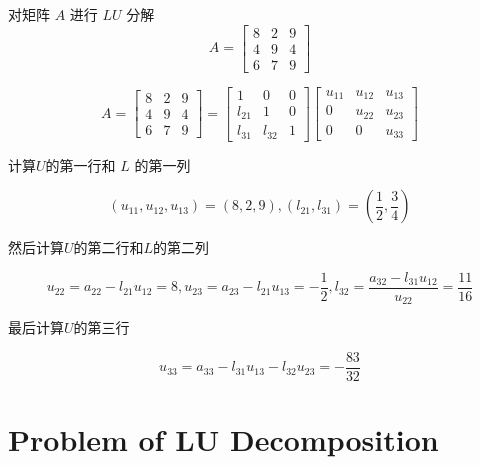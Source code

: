 \begin{example}
    对矩阵 $ A $ 进行 $ L U $ 分解
    \begin{equation}
        A=\left[\begin{array}{lll}
                8 & 2 & 9 \\
                4 & 9 & 4 \\
                6 & 7 & 9
            \end{array}\right]
    \end{equation}


    \begin{equation} A=\left[\begin{array}{lll}8 & 2 & 9 \\ 4 & 9 & 4 \\ 6 & 7 & 9\end{array}\right]=\left[\begin{array}{ccc}1 & 0 & 0 \\ l_{21} & 1 & 0 \\ l_{31} & l_{32} & 1\end{array}\right]\left[\begin{array}{ccc}u_{11} & u_{12} & u_{13} \\ 0 & u_{22} & u_{23} \\ 0 & 0 & u_{33}\end{array}\right] \end{equation}

    计算$U$的第一行和 $ L $ 的第一列

    \begin{equation} \left(u_{11}, u_{12}, u_{13}\right)=(8,2,9) , \left(l_{21}, l_{31}\right)=\left(\frac{1}{2}, \frac{3}{4}\right) \end{equation}

    然后计算$U$的第二行和$L$的第二列

    \begin{equation} u_{22}=a_{22}-l_{21} u_{12}=8 ,
        u_{23}=a_{23}-l_{21} u_{13}=-\frac{1}{2} , l_{32}=\frac{a_{32}-l_{31} u_{12}}{u_{22}}=\frac{11}{16} \end{equation}


    最后计算$U$的第三行

    \begin{equation} u_{33}=a_{33}-l_{31}  u_{13}-l_{32} u_{23}=-\frac{83}{32} \end{equation}

\end{example}

\section{Problem of LU Decomposition}


